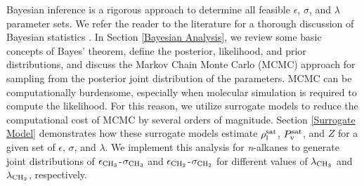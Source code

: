 \documentclass[preprint,letterpaper,floatfix,citeautoscript,aip,jcp]{revtex4-1}
\begin{document}
Bayesian inference is a rigorous approach to determine all feasible $\epsilon$, $\sigma$, and $\lambda$ parameter sets.
We refer the reader to the literature for a thorough discussion of Bayesian statistics \cite{Bay_Deriv,Bay_MD,Bay_UQ,Wu2016,Kulakova2017}. In Section \ref{Bayesian Analysis}, we review some basic concepts of Bayes' theorem, define the posterior, likelihood, and prior distributions, and discuss the Markov Chain Monte Carlo (MCMC) approach
for sampling from the posterior joint distribution of the parameters.
MCMC can be computationally burdensome, especially when molecular simulation is required to compute the likelihood. For this reason, we utilize surrogate models to reduce the computational cost of MCMC by several orders of magnitude. Section \ref{Surrogate Model} demonstrates how these surrogate models estimate $\rho_{\rm l}^{\rm sat}$, $P_{\rm v}^{\rm sat}$, and $Z$ for a given set of $\epsilon$, $\sigma$, and $\lambda$.
We implement this analysis for \textit{n}-alkanes to generate joint distributions of $\epsilon_{\rm CH_3}$-$\sigma_{\rm CH_3}$ and $\epsilon_{\rm CH_2}$-$\sigma_{\rm CH_2}$ for different values of $\lambda_{\rm CH_3}$ and $\lambda_{\rm CH_2}$, respectively.
\end{document}
